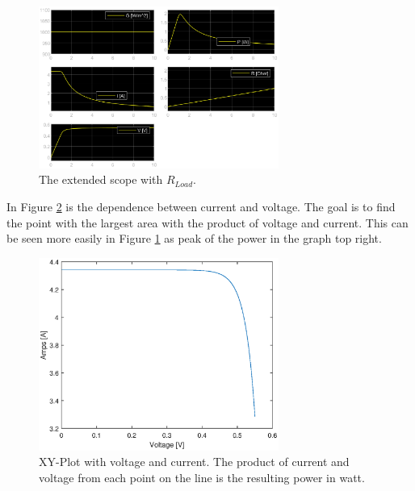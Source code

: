 		\begin{figure}[H]
			\centering
			\includegraphics[width=0.7\textwidth]{figures/var_r.eps}
			\caption{The extended scope with $R_{Load}$.}
			\label{fig:var_r}
		\end{figure}
	In Figure \ref{fig:xy} is the dependence between current and voltage. 
	The goal is to find the point with the largest area with the product of voltage and current.
	This can be seen more easily in Figure \ref{fig:var_r} as peak of the power in the graph top right.
	
		\begin{figure}[H]
			\centering
			\includegraphics[width=0.7\textwidth]{figures/xy.eps}
			\caption{XY-Plot with voltage and current. The product of current and voltage from each point on the line is the resulting power in watt.}
			\label{fig:xy}
		\end{figure}
	

%

